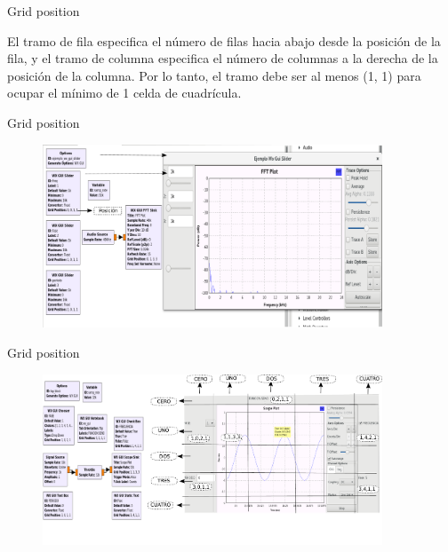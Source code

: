 \begin{frame}{Grid position}

El tramo de fila especifica el número de filas hacia abajo desde la posición de la fila, y el tramo de columna especifica el número de columnas a la derecha de la posición de la columna. Por lo tanto, el tramo debe ser al menos (1, 1) para ocupar el mínimo de 1 celda de cuadrícula.

\end{frame}

\begin{frame}{Grid position}

\begin{figure}[H]
\centering
\vspace{-3mm}
\includegraphics[width=0.9\textwidth]{parte1/lab3/pdf/lab0_2.pdf}
\end{figure}

\end{frame}

\begin{frame}{Grid position}

\begin{figure}[H]
\centering
\vspace{-3mm}
\includegraphics[width=0.9\textwidth]{parte1/lab3/pdf/lab0_3.pdf}
\end{figure}

\end{frame}

